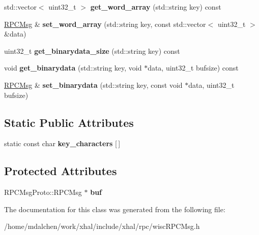 \begin{DoxyCompactItemize}
\item 
\hypertarget{classwisc_1_1RPCMsg_a203743c8f104f8486a6c95984be87b9d}{
std::vector$<$ uint32\_\-t $>$ {\bfseries get\_\-word\_\-array} (std::string key) const }
\label{classwisc_1_1RPCMsg_a203743c8f104f8486a6c95984be87b9d}

\item 
\hypertarget{classwisc_1_1RPCMsg_a9c2a54a79761855f0c1a8146a5370a61}{
\hyperlink{classwisc_1_1RPCMsg}{RPCMsg} \& {\bfseries set\_\-word\_\-array} (std::string key, const std::vector$<$ uint32\_\-t $>$ \&data)}
\label{classwisc_1_1RPCMsg_a9c2a54a79761855f0c1a8146a5370a61}

\item 
\hypertarget{classwisc_1_1RPCMsg_ab174bab429c56950e3593ef9003facf4}{
uint32\_\-t {\bfseries get\_\-binarydata\_\-size} (std::string key) const }
\label{classwisc_1_1RPCMsg_ab174bab429c56950e3593ef9003facf4}

\item 
\hypertarget{classwisc_1_1RPCMsg_a04c9eb09c682d5d9d40ac24b7fd4c689}{
void {\bfseries get\_\-binarydata} (std::string key, void $\ast$data, uint32\_\-t bufsize) const }
\label{classwisc_1_1RPCMsg_a04c9eb09c682d5d9d40ac24b7fd4c689}

\item 
\hypertarget{classwisc_1_1RPCMsg_aa188bd60349372ae59d7383a0be59e0c}{
\hyperlink{classwisc_1_1RPCMsg}{RPCMsg} \& {\bfseries set\_\-binarydata} (std::string key, const void $\ast$data, uint32\_\-t bufsize)}
\label{classwisc_1_1RPCMsg_aa188bd60349372ae59d7383a0be59e0c}

\end{DoxyCompactItemize}
\subsection*{Static Public Attributes}
\begin{DoxyCompactItemize}
\item 
\hypertarget{classwisc_1_1RPCMsg_a536c8c44cc07203cd78d6dbf3d507d54}{
static const char {\bfseries key\_\-characters} \mbox{[}$\,$\mbox{]}}
\label{classwisc_1_1RPCMsg_a536c8c44cc07203cd78d6dbf3d507d54}

\end{DoxyCompactItemize}
\subsection*{Protected Attributes}
\begin{DoxyCompactItemize}
\item 
\hypertarget{classwisc_1_1RPCMsg_a1d83a73af2e27570cbef8f0e60773967}{
RPCMsgProto::RPCMsg $\ast$ {\bfseries buf}}
\label{classwisc_1_1RPCMsg_a1d83a73af2e27570cbef8f0e60773967}

\end{DoxyCompactItemize}


The documentation for this class was generated from the following file:\begin{DoxyCompactItemize}
\item 
/home/mdalchen/work/xhal/include/xhal/rpc/wiscRPCMsg.h\end{DoxyCompactItemize}
